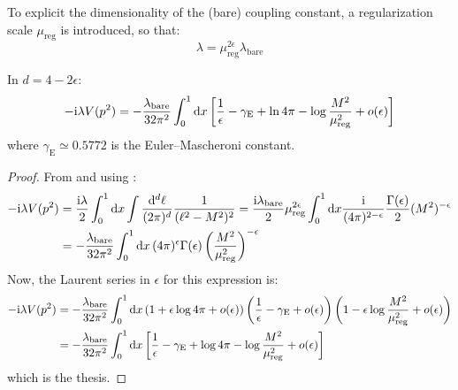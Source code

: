 To explicit the dimensionality of the (bare) coupling constant, a regularization scale $ \mu_\text{reg} $ is introduced, so that:
\begin{equation}
  \lambda = \mu_\text{reg}^{2\epsilon} \lambda_\text{bare}
\end{equation}

\begin{proposition}{}{}
  In $ d = 4 - 2\epsilon $:
  \begin{equation}
    -\mathrm{i} \lambda V(p^2) = - \frac{\lambda_\text{bare}}{32\pi^2} \int_0^1 \mathrm{d} x \left[ \frac{1}{\epsilon} - \gamma_\text{E} + \ln 4\pi - \log \frac{M^2}{\mu_\text{reg}^2} + o(\epsilon) \right]
  \end{equation}
  where $ \gamma_\text{E} \simeq 0.5772 $ is the Euler--Mascheroni constant.
\end{proposition}

\begin{proofbox}
  \begin{proof}
    From  and using :
    \begin{equation*}
      \begin{split}
        -\mathrm{i} \lambda V(p^2)
        & = \frac{\mathrm{i} \lambda}{2} \int_0^1 \mathrm{d} x \int \frac{\mathrm{d}^d\ell}{(2\pi)^d} \frac{1}{(\ell^2 - M^2)^2} = \frac{\mathrm{i} \lambda_\text{bare}}{2} \mu_\text{reg}^{2\epsilon} \int_0^1 \mathrm{d} x \frac{\mathrm{i}}{(4\pi)^{2 - \epsilon}} \frac{\Gamma(\epsilon)}{2} (M^2)^{-\epsilon} \\
        & = - \frac{\lambda_\text{bare}}{32\pi^2} \int_0^1 \mathrm{d} x \, (4\pi)^\epsilon \Gamma(\epsilon) \left( \frac{M^2}{\mu_\text{reg}^2} \right)^{-\epsilon}
      \end{split}
    \end{equation*}
    Now, the Laurent series in $ \epsilon $ for this expression is:
    \begin{equation*}
      \begin{split}
        -\mathrm{i} \lambda V(p^2)
        &= - \frac{\lambda_\text{bare}}{32\pi^2} \int_0^1 \mathrm{d} x \left( 1 + \epsilon \log 4\pi + o(\epsilon) \right) \left( \frac{1}{\epsilon} - \gamma_\text{E} + o(\epsilon) \right) \left( 1 - \epsilon \log \frac{M^2}{\mu_\text{reg}^2} + o(\epsilon) \right) \\
        & = - \frac{\lambda_\text{bare}}{32\pi^2} \int_0^1 \mathrm{d} x \left[ \frac{1}{\epsilon} - \gamma_\text{E} + \log 4\pi - \log \frac{M^2}{\mu_\text{reg}^2} + o(\epsilon) \right]
      \end{split}
    \end{equation*}
    which is the thesis.
  \end{proof}
\end{proofbox}

